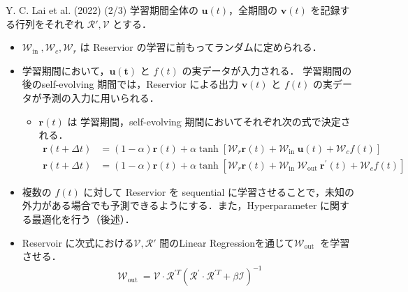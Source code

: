 \begin{frame}{Y. C. Lai et al. (2022) (2/3)}
    学習期間全体の $\mathbf{u}(t)$，全期間の $\mathbf{v}(t)$ を記録する行列をそれぞれ $\mathcal{R'}, \mathcal{V}$ とする．
    \begin{itemize}
        \item $\mathcal{W}_{\text {in }}, \mathcal{W}_c, \mathcal{W}_r$ は Reservior の学習に前もってランダムに定められる．
        \item 学習期間において，$\mathbf{u(t)}$ と $f(t)$ の実データが入力される．
        学習期間の後のself-evolving 期間では，Reservior による出力 $\mathbf{v}(t)$ と $f(t)$ の実データが予測の入力に用いられる．
        \begin{itemize}
            \item $\mathbf{r}(t)$ は 学習期間，self-evolving 期間においてそれぞれ次の式で決定される．
            \vspace{-.2cm}
            \begin{align}
                \mathbf{r}(t+\Delta t) & =(1-\alpha) \mathbf{r}(t) + \alpha \tanh \left[\mathcal{W}_r \mathbf{r}(t)+\mathcal{W}_{\text {in }} \mathbf{u}(t)+\mathcal{W}_c f(t)\right] \\
                \mathbf{r}(t+\Delta t) & =(1-\alpha) \mathbf{r}(t) + \alpha \tanh \left[\mathcal{W}_r \mathbf{r}(t)+\mathcal{W}_{\text {in }} \mathcal{W}_{\text {out }} \mathbf{r}^{\prime}(t)+\mathcal{W}_c f(t)\right]
            \end{align}
        \end{itemize}
        \item 複数の $f(t)$ に対して Reservior を sequential に学習させることで，未知の外力がある場合でも予測できるようにする．また，Hyperparameter に関する最適化を行う（後述）．
        \item Reservoir に次式における$\mathcal{V}, \mathcal{R'}$ 間のLinear Regressionを通じて$\mathcal{W}_{\text {out }}$ を学習させる．
        \vspace{-.2cm}
        \begin{align}
            \mathcal{W}_{\text {out }}=\mathcal{V} \cdot \mathcal{R}^{\prime T}\left(\mathcal{R}^{\prime} \cdot \mathcal{R}^{\prime T}+\beta \mathcal{I}\right)^{-1}
        \end{align}
    \end{itemize}

\end{frame}

